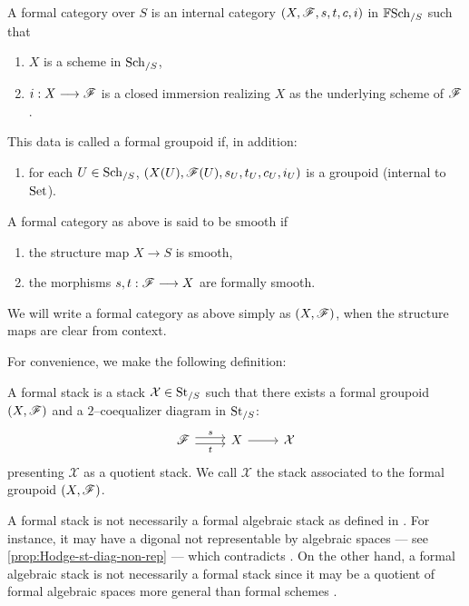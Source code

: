 \documentclass[11pt]{amsart}
\begin{document}
\begin{defn}
\label{defn:form-cat}
A formal category over $S$ is an internal category $(X, \mathscr{F}, s, t, c, i)$ in
$\mathbb{F}\mathrm{Sch}_{/S}$ such that
\begin{enumerate}
\item $X$ is a scheme in $\mathrm{Sch}_{/S}$,
\item $i : X \to \sF$ is a closed immersion realizing $X$ as the underlying
scheme of $\mathscr{F}$.
\end{enumerate}
This data is called a formal groupoid if, in addition:
\begin{enumerate}[resume]
\item for each $U \in \mathrm{Sch}_{/S}$, $(X(U), \mathscr{F}(U), s_U, t_U, c_U, i_U)$
is a groupoid (internal to $\mathrm{Set}$).
\end{enumerate}
A formal category as above is said to be smooth if
\begin{enumerate}[resume]
\item the structure map $X \to S$ is smooth,
\item the morphisms $s, t : \sF \to X$ are formally smooth.
\end{enumerate}
\end{defn}

\begin{notn}
We will write a formal category as above simply as $(X, \mathscr{F})$,
when the structure maps are clear from context.
\end{notn}

For convenience, we make the following definition:
\begin{defn}
\label{defn:form-st}
A formal stack is a stack $\mathcal{X} \in \mathrm{St}_{/S}$ such that there exists
a formal groupoid $(X, \mathscr{F})$ and a $2$--coequalizer diagram in $\mathrm{St}_{/S}$:
\[\begin{tikzcd}
\sF \ar[r, shift left, "s"] \ar[r, shift right, "t" below] &
X \ar[r] &
\mathcal{X}
\end{tikzcd}\]
presenting $\mathcal{X}$ as a quotient stack.
We call $\mathcal{X}$ the stack associated to the formal groupoid
$(X, \mathscr{F})$.
\end{defn}

\begin{warn}
A formal stack is not necessarily a formal algebraic stack as defined in
\cite[Definition 5.3]{FormalAlgSt}. For instance, it may have a digonal
not representable by algebraic spaces --- see \cref{prop:Hodge-st-diag-non-rep}
--- which contradicts \cite[Lemma 5.12.]{FormalAlgSt}.
On the other hand, a formal algebraic stack is not necessarily a formal stack
since it may be a quotient of formal algebraic spaces more general than formal
schemes \cite[47]{FormalAlgSt}.
\end{warn}
\end{document}
